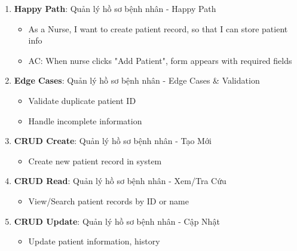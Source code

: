 \documentclass[12pt,a4paper]{article}
\begin{document}
\begin{enumerate}
    \item \textbf{Happy Path}: Quản lý hồ sơ bệnh nhân - Happy Path
    \begin{itemize}
        \item As a Nurse, I want to create patient record, so that I can store patient info
        \item AC: When nurse clicks "Add Patient", form appears with required fields
    \end{itemize}
    
    \item \textbf{Edge Cases}: Quản lý hồ sơ bệnh nhân - Edge Cases \& Validation
    \begin{itemize}
        \item Validate duplicate patient ID
        \item Handle incomplete information
    \end{itemize}
    
    \item \textbf{CRUD Create}: Quản lý hồ sơ bệnh nhân - Tạo Mới
    \begin{itemize}
        \item Create new patient record in system
    \end{itemize}
    
    \item \textbf{CRUD Read}: Quản lý hồ sơ bệnh nhân - Xem/Tra Cứu
    \begin{itemize}
        \item View/Search patient records by ID or name
    \end{itemize}
    
    \item \textbf{CRUD Update}: Quản lý hồ sơ bệnh nhân - Cập Nhật
    \begin{itemize}
        \item Update patient information, history
    \end{itemize}
\end{enumerate}
\end{document}

